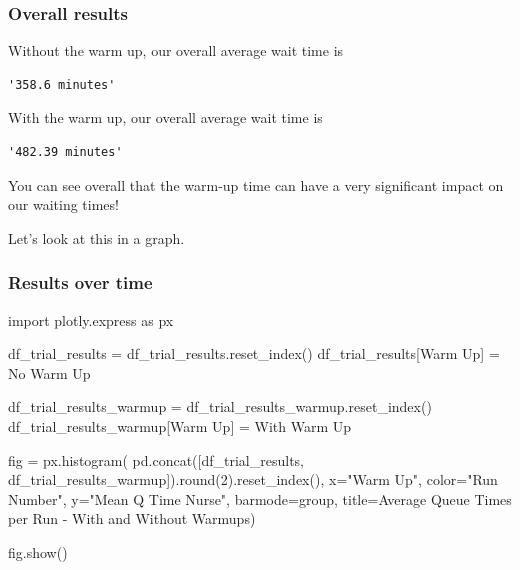 \documentclass[
  letterpaper,
  DIV=11,
  numbers=noendperiod]{scrreprt}
\newenvironment{Shaded}{}{}
\newcommand{\BuiltInTok}[1]{\textcolor[rgb]{0.84,0.23,0.29}{#1}}
\newcommand{\DecValTok}[1]{\textcolor[rgb]{0.00,0.36,0.77}{#1}}
\newcommand{\ImportTok}[1]{\textcolor[rgb]{0.01,0.18,0.38}{#1}}
\newcommand{\NormalTok}[1]{\textcolor[rgb]{0.14,0.16,0.18}{#1}}
\newcommand{\OperatorTok}[1]{\textcolor[rgb]{0.14,0.16,0.18}{#1}}
\newcommand{\StringTok}[1]{\textcolor[rgb]{0.01,0.18,0.38}{#1}}
\begin{document}
\subsubsection{Overall results}\label{overall-results}

Without the warm up, our overall average wait time is

\begin{verbatim}
'358.6 minutes'
\end{verbatim}

With the warm up, our overall average wait time is

\begin{verbatim}
'482.39 minutes'
\end{verbatim}

You can see overall that the warm-up time can have a very significant
impact on our waiting times!

Let's look at this in a graph.

\subsubsection{Results over time}\label{results-over-time}

\begin{Shaded}
\begin{Highlighting}[]
\ImportTok{import}\NormalTok{ plotly.express }\ImportTok{as}\NormalTok{ px}

\NormalTok{df\_trial\_results }\OperatorTok{=}\NormalTok{ df\_trial\_results.reset\_index()}
\NormalTok{df\_trial\_results[}\StringTok{\textquotesingle{}Warm Up\textquotesingle{}}\NormalTok{] }\OperatorTok{=} \StringTok{\textquotesingle{}No Warm Up\textquotesingle{}}

\NormalTok{df\_trial\_results\_warmup }\OperatorTok{=}\NormalTok{ df\_trial\_results\_warmup.reset\_index()}
\NormalTok{df\_trial\_results\_warmup[}\StringTok{\textquotesingle{}Warm Up\textquotesingle{}}\NormalTok{] }\OperatorTok{=} \StringTok{\textquotesingle{}With Warm Up\textquotesingle{}}

\NormalTok{fig }\OperatorTok{=}\NormalTok{ px.histogram(}
\NormalTok{    pd.concat([df\_trial\_results, df\_trial\_results\_warmup]).}\BuiltInTok{round}\NormalTok{(}\DecValTok{2}\NormalTok{).reset\_index(),}
\NormalTok{    x}\OperatorTok{=}\StringTok{"Warm Up"}\NormalTok{,}
\NormalTok{    color}\OperatorTok{=}\StringTok{"Run Number"}\NormalTok{, y}\OperatorTok{=}\StringTok{"Mean Q Time Nurse"}\NormalTok{,}
\NormalTok{    barmode}\OperatorTok{=}\StringTok{\textquotesingle{}group\textquotesingle{}}\NormalTok{,}
\NormalTok{    title}\OperatorTok{=}\StringTok{\textquotesingle{}Average Queue Times per Run {-} With and Without Warmups\textquotesingle{}}\NormalTok{)}

\NormalTok{fig.show()}
\end{Highlighting}
\end{Shaded}
\end{document}
